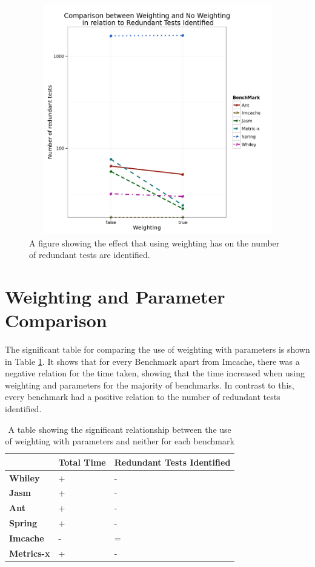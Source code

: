 \begin{figure}[H]
\begin{center}
\includegraphics[height=10cm, width = 14.5cm]{Weighting.png}
\end{center}
\caption{A figure showing the effect that using weighting has on the number of redundant tests are identified.}
\label{fig:weightgraph}
\end{figure}

\section{Weighting and Parameter Comparison}

The significant table for comparing the use of weighting with parameters is shown in Table \ref{weightingparamsig}. It shows that for every Benchmark apart from Imcache, there was a negative relation for the time taken, showing that the time increased when using weighting and parameters for the majority of benchmarks. In contrast to this, every benchmark had a positive relation to the number of redundant tests identified.

\begin{table}[H]
\centering
\label{weightingparamsig}
\begin{tabular}{|l|l|l|}
\hline
{\bf }          & {\bf Total Time} & {\bf Redundant Tests Identified} \\ \hline
{\bf Whiley}    & +                & -                           \\ \hline
{\bf Jasm}      & +                & -                           \\ \hline
{\bf Ant}       & +                & -                           \\ \hline
{\bf Spring}    & +                & -                           \\ \hline
{\bf Imcache}   & -                & =                           \\ \hline
{\bf Metrics-x} & +                & -                           \\ \hline
\end{tabular}
\caption{A table showing the significant relationship between the use of weighting with parameters and neither for each benchmark}
\end{table}

